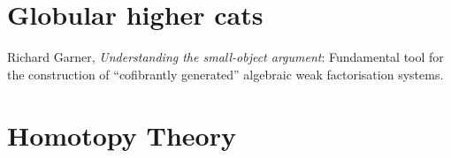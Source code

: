 \documentclass{article}
\begin{document}
\section{Globular higher cats}

\cite{garner:understanding} Richard Garner, \emph{Understanding the small-object argument}:  Fundamental tool for the construction of ``cofibrantly generated'' algebraic weak factorisation systems.


\section{Homotopy Theory}



\end{document}
